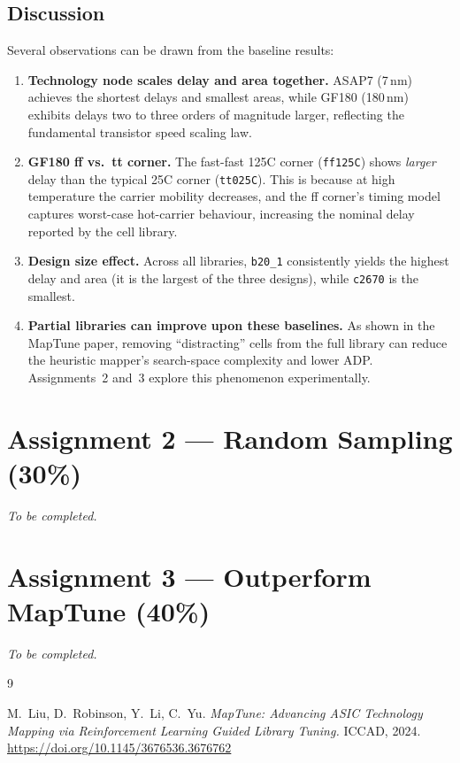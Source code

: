 \documentclass[12pt, a4paper]{report}
\begin{document}
\section{Discussion}

Several observations can be drawn from the baseline results:

\begin{enumerate}[noitemsep]
  \item \textbf{Technology node scales delay and area together.}
        ASAP7 (7\,nm) achieves the shortest delays and smallest areas,
        while GF180 (180\,nm) exhibits delays two to three orders of magnitude
        larger, reflecting the fundamental transistor speed scaling law.

  \item \textbf{GF180 ff vs.\ tt corner.}
        The fast-fast 125\textdegree{}C corner (\texttt{ff125C}) shows
        \emph{larger} delay than the typical 25\textdegree{}C corner
        (\texttt{tt025C}).
        This is because at high temperature the carrier mobility decreases,
        and the ff corner's timing model captures worst-case hot-carrier
        behaviour, increasing the nominal delay reported by the cell library.

  \item \textbf{Design size effect.}
        Across all libraries, \texttt{b20\_1} consistently yields the highest
        delay and area (it is the largest of the three designs), while
        \texttt{c2670} is the smallest.

  \item \textbf{Partial libraries can improve upon these baselines.}
        As shown in the MapTune paper, removing ``distracting'' cells from
        the full library can reduce the heuristic mapper's search-space
        complexity and lower ADP.
        Assignments~2 and~3 explore this phenomenon experimentally.
\end{enumerate}

\chapter{Assignment 2 --- Random Sampling (30\%)}

\textit{To be completed.}

\chapter{Assignment 3 --- Outperform MapTune (40\%)}

\textit{To be completed.}

\begin{thebibliography}{9}

M.~Liu, D.~Robinson, Y.~Li, C.~Yu.
\textit{MapTune: Advancing ASIC Technology Mapping via Reinforcement Learning
Guided Library Tuning.}
ICCAD, 2024.
\url{https://doi.org/10.1145/3676536.3676762}

\end{thebibliography}
\end{document}
